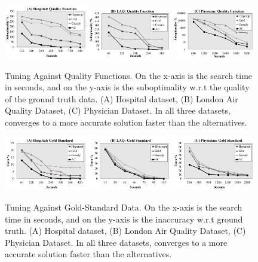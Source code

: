 \begin{figure}[ht]
\centering
 \includegraphics[width=0.32\textwidth]{exp/exp2a.png}
 \includegraphics[width=0.32\textwidth]{exp/exp2b.png}
 \includegraphics[width=0.32\textwidth]{exp/exp2c.png}
 \caption{ Tuning Against Quality Functions. On the x-axis is the search time in seconds, and on the y-axis is the suboptimality w.r.t the quality of the ground truth data. (A) Hospital dataset, (B) London Air Quality Dataset, (C) Physician Dataset. In all three datasets, \sys converges to a more accurate solution faster than the alternatives. \label{exp2}}
\end{figure}

\begin{figure}[ht]
\centering
 \includegraphics[width=0.32\textwidth]{exp/exp1a.png}
 \includegraphics[width=0.32\textwidth]{exp/exp1b.png}
 \includegraphics[width=0.32\textwidth]{exp/exp1c.png}
 \caption{ Tuning Against Gold-Standard Data. On the x-axis is the search time in seconds, and on the y-axis is the inaccuracy w.r.t ground truth. (A) Hospital dataset, (B) London Air Quality Dataset, (C) Physician Dataset. In all three datasets, \sys converges to a more accurate solution faster than the alternatives.   \label{exp1}}
\end{figure}

